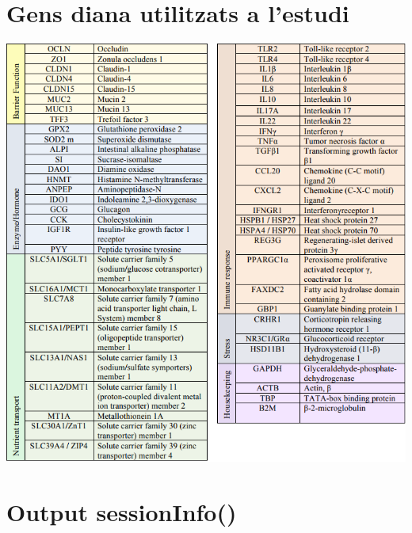 \documentclass[english]{article}
\begin{document}
\section{Gens diana utilitzats a l'estudi}
\label{annex:b}
\begin{center}
\includegraphics[scale=0.7]{genes.png}
\end{center}
\clearpage
\section{Output sessionInfo()}
\label{annex:d}

\end{document}

